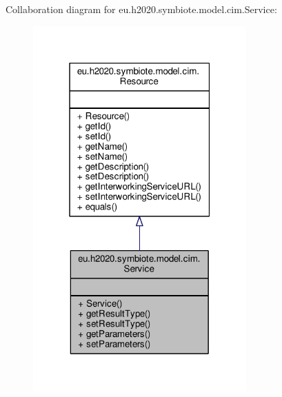 Collaboration diagram for eu.\+h2020.\+symbiote.\+model.\+cim.\+Service\+:
\nopagebreak
\begin{figure}[H]
\begin{center}
\leavevmode
\includegraphics[width=232pt]{classeu_1_1h2020_1_1symbiote_1_1model_1_1cim_1_1Service__coll__graph}
\end{center}
\end{figure}
